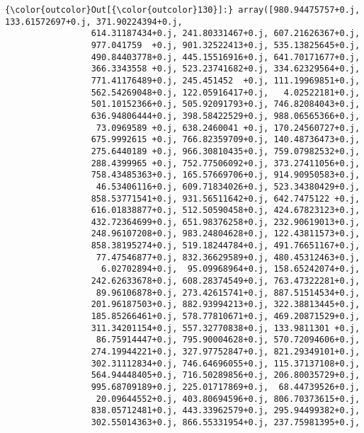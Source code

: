 \documentclass[11pt]{article}
\begin{document}
\begin{Verbatim}[commandchars=\\\{\}]
{\color{outcolor}Out[{\color{outcolor}130}]:} array([980.94475757+0.j, 133.61572697+0.j, 371.90224394+0.j,
                 614.31187434+0.j, 241.80331467+0.j, 607.21626367+0.j,
                 977.041759  +0.j, 901.32522413+0.j, 535.13825645+0.j,
                 490.84403778+0.j, 445.15516916+0.j, 641.70171677+0.j,
                 366.3343558 +0.j, 523.23741682+0.j, 334.62329564+0.j,
                 771.41176489+0.j, 245.451452  +0.j, 111.19969851+0.j,
                 562.54269048+0.j, 122.05916417+0.j,   4.02522181+0.j,
                 501.10152366+0.j, 505.92091793+0.j, 746.82084043+0.j,
                 636.94806444+0.j, 398.58422529+0.j, 988.06565366+0.j,
                  73.0969589 +0.j, 638.2460041 +0.j, 170.24560727+0.j,
                 675.9992615 +0.j, 766.82359709+0.j, 140.48736473+0.j,
                 275.6440189 +0.j, 966.30810435+0.j, 759.07982532+0.j,
                 288.4399965 +0.j, 752.77506092+0.j, 373.27411056+0.j,
                 758.43485363+0.j, 165.57669706+0.j, 914.90950583+0.j,
                  46.53406116+0.j, 609.71834026+0.j, 523.34380429+0.j,
                 858.53771541+0.j, 931.56511642+0.j, 642.7475122 +0.j,
                 616.01838877+0.j, 512.50590458+0.j, 424.67823123+0.j,
                 432.72364699+0.j, 651.98376258+0.j, 232.90619013+0.j,
                 248.96107208+0.j, 983.24804628+0.j, 122.43811573+0.j,
                 858.38195274+0.j, 519.18244784+0.j, 491.76651167+0.j,
                  77.47546877+0.j, 832.36629589+0.j, 480.45312463+0.j,
                   6.02702894+0.j,  95.09968964+0.j, 158.65242074+0.j,
                 242.62633678+0.j, 608.28374549+0.j, 763.47322281+0.j,
                  89.96106878+0.j, 273.42615741+0.j, 887.51514534+0.j,
                 201.96187503+0.j, 882.93994213+0.j, 322.38813445+0.j,
                 185.85266461+0.j, 578.77810671+0.j, 469.20871529+0.j,
                 311.34201154+0.j, 557.32770838+0.j, 133.9811301 +0.j,
                  86.75914447+0.j, 795.90004628+0.j, 570.72094606+0.j,
                 274.19944221+0.j, 327.97752847+0.j, 821.29349101+0.j,
                 302.31112834+0.j, 746.64696055+0.j, 115.37137108+0.j,
                 564.94448405+0.j, 716.50289856+0.j, 206.80035729+0.j,
                 995.68709189+0.j, 225.01717869+0.j,  68.44739526+0.j,
                  20.09644552+0.j, 403.80694596+0.j, 806.70373615+0.j,
                 838.05712481+0.j, 443.33962579+0.j, 295.94499382+0.j,
                 302.55014363+0.j, 866.55331954+0.j, 237.75981395+0.j,

\end{Verbatim}
\end{document}
